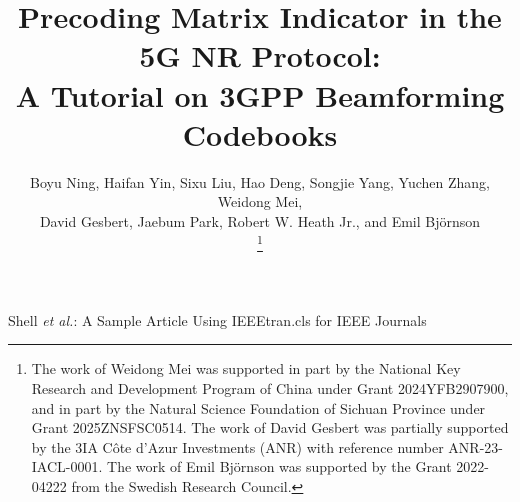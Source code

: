 \documentclass[lettersize,journal]{IEEEtran}
\begin{document}
\title{Precoding Matrix Indicator in the 5G NR Protocol:\\ A Tutorial on 3GPP Beamforming Codebooks}
\author{Boyu Ning, Haifan Yin, Sixu Liu, Hao Deng, Songjie Yang, Yuchen Zhang, Weidong Mei,\\
David Gesbert,  Jaebum Park, Robert W. Heath Jr., and Emil Bj{\"o}rnson


\thanks{The work of Weidong Mei was supported in part by the National Key Research and Development Program of China under Grant 2024YFB2907900, and in part by the Natural Science Foundation of Sichuan Province under Grant 2025ZNSFSC0514. The work of David Gesbert was partially supported by the 3IA Côte d’Azur Investments (ANR) with reference number ANR-23-IACL-0001. The work of Emil Bj{\"o}rnson was supported by the Grant 2022-04222 from the Swedish Research Council.
}

}        

%
{Shell \MakeLowercase{\textit{et al.}}: A Sample Article Using IEEEtran.cls for IEEE Journals}

\maketitle
\end{document}
